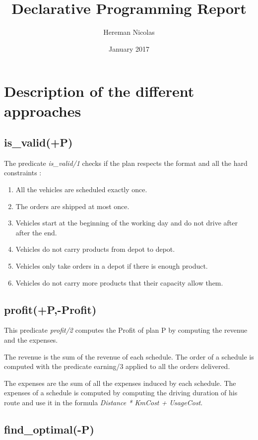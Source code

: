 \documentclass{article}
\title{Declarative Programming Report}
\author{Hereman Nicolas}
\date{January 2017}
\begin{document}
\maketitle

\section{Description of the different approaches}

\subsection{is\_valid(+P)}

The predicate \textit{is\_valid/1} checks if the plan respects the format and all the hard constraints :

\begin{enumerate}
    \item All the vehicles are scheduled exactly once.
    \item The orders are shipped at most once.
    \item Vehicles start at the beginning of the working day and do not drive after after the end.
    \item Vehicles do not carry products from depot to depot.
    \item Vehicles only take orders in a depot if there is enough product.
    \item Vehicles do not carry more products that their capacity allow them.
\end{enumerate}

\subsection{profit(+P,-Profit)}

This predicate \textit{profit/2} computes the Profit of plan P by computing the revenue and the expenses.

The revenue is the sum of the revenue of each schedule. The order of a schedule is computed with the predicate earning/3 applied to all the orders delivered.

The expenses are the sum of all the expenses induced by each schedule. The expenses of a schedule is computed by computing the driving duration of his route and use it in the formula \textit{Distance * KmCost + UsageCost}.


\subsection{find\_optimal(-P)}
\end{document}

